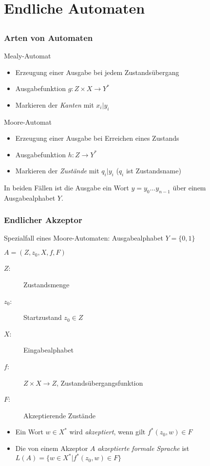 \section{Endliche Automaten}
\subsection*{}
\begin{frame}
  \frametitle{Arten von Automaten}
  \pause
  \begin{block}{Mealy-Automat}
    \begin{itemize}
      \item Erzeugung einer Ausgabe bei jedem Zustandsübergang
      \item Ausgabefunktion $g: Z \times X \rightarrow Y^*$
      \item Markieren der \emph{Kanten} mit $x_i|y_i$
    \end{itemize}
   \end{block}
  \pause
  \begin{block}{Moore-Automat}
    \begin{itemize}
      \item Erzeugung einer Ausgabe bei Erreichen eines Zustands
      \item Ausgabefunktion $h: Z \rightarrow Y^*$
      \item Markieren der \emph{Zustände} mit $q_i|y_i$ ($q_i$ ist Zustandsname)
    \end{itemize}
  \end{block}

  In beiden Fällen ist die Ausgabe ein Wort $y = y_0\ldots y_{n-1}$ über einem
  Ausgabealphabet $Y$.
\end{frame}

\begin{frame}
  \frametitle{Endlicher Akzeptor}
  Spezialfall eines Moore-Automaten: Ausgabealphabet $Y = \{0, 1\}$
  \begin{definition}
    $A = (Z, z_0, X, f, F)$
    \begin{description}
      \item[$Z$:] Zustandsmenge
      \item[$z_0$:] Startzustand $z_0 \in Z$
      \item[$X$:] Eingabealphabet
      \item[$f$:] $Z \times X \longrightarrow Z$, Zustandsübergangsfunktion
      \item[$F$:] Akzeptierende Zustände
    \end{description}
  \end{definition}
  \begin{itemize}
    \item Ein Wort $w\in X^*$ wird \emph{akzeptiert}, wenn gilt $f^*(z_0,w)\in F$
    \item Die von einem Akzeptor $A$ \emph{akzeptierte formale Sprache} ist $L(A)=\{w \in X^* |f^*(z_0,w)\in F\}$
   \end{itemize}
\end{frame}

